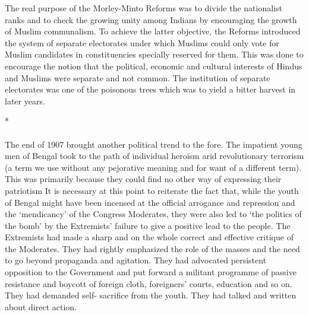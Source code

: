 The real purpose of the Morley-Minto Reforms was to divide the nationalist ranks and to check the growing unity among Indians by encouraging the growth of Muslim communalism. To achieve the latter objective, the Reforms introduced the system of separate electorates under which Muslims could only vote for Muslim candidates in constituencies specially reserved for them. This was done to encourage the notion that the political, economic and cultural interests of Hindus and Muslims were separate and not common. The institution of separate electorates was one of the poisonous trees which was to yield a bitter harvest in later years.

\begin{center}*\end{center}

\paragraph*{}


The end of 1907 brought another political trend to the fore. The impatient young men of Bengal took to the path of individual heroism arid revolutionary terrorism (a term we use without any pejorative meaning and for want of a different term). This was primarily because they could find no other way of expressing their patriotism It is necessary at this point to reiterate the fact that, while the youth of Bengal might have been incensed at the official arrogance and repression and the `mendicancy' of the Congress Moderates, they were also led to `the politics of the bomb' by the Extremists' failure to give a positive lead to the people. The Extremists had made a sharp and on the whole correct and effective critique of the Moderates. They had rightly emphasized the role of the masses and the need to go beyond propaganda and agitation. They had advocated persistent opposition to the Government and put forward a militant programme of passive resistance and boycott of foreign cloth, foreigners' courts, education and so on. They had demanded self- sacrifice from the youth. They had talked and written about direct action.

